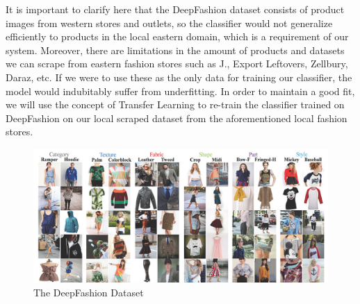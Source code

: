 It is important to clarify here that the DeepFashion dataset consists of product images from western stores and outlets, so the classifier would not generalize efficiently to products in the local eastern domain, which is a  requirement of our system. Moreover, there are limitations in the amount of products and datasets we can scrape from eastern fashion stores such as J., Export Leftovers, Zellbury, Daraz, etc. If we were to use these as the only data for training our classifier, the model would indubitably suffer from underfitting. In order to maintain a good fit, we will use the concept of Transfer Learning to re-train the classifier trained on DeepFashion on our local scraped dataset from the aforementioned local fashion stores.

\begin{figure}[H]
\includegraphics[width=15cm]{images/DeepFashion.pdf} 
\centering
\caption{The DeepFashion Dataset}
\label{dataset:DeepFashion}
\end{figure}

